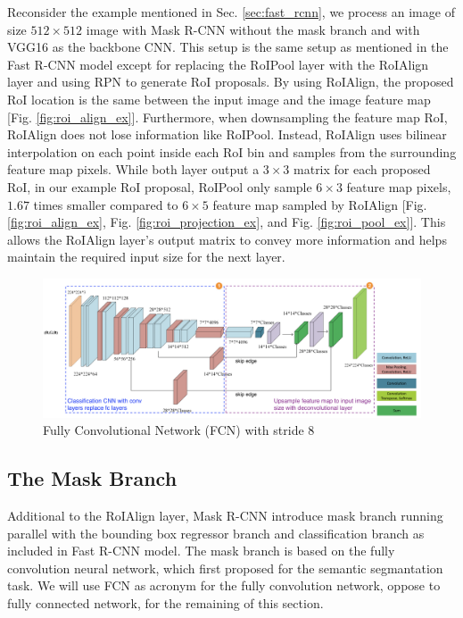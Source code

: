 Reconsider the example mentioned in Sec. \ref{sec:fast_rcnn}, we process an image of size $512 \times 512$ image with Mask R-CNN without the mask branch and with VGG16 as the backbone CNN. This setup is the same setup as mentioned in the Fast R-CNN model except for replacing the RoIPool layer with the RoIAlign layer and using RPN to generate RoI proposals. By using RoIAlign, the proposed RoI location is the same between the input image and the image feature map [Fig. \ref{fig:roi_align_ex}]. Furthermore, when downsampling the feature map RoI, RoIAlign does not lose information like RoIPool. Instead, RoIAlign uses bilinear interpolation on each point inside each RoI bin and samples from the surrounding feature map pixels. While both layer output a $3 \times 3$ matrix for each proposed RoI, in our example RoI proposal, RoIPool only sample $6 \times 3$ feature map pixels, $1.67$ times smaller compared to $6 \times 5$ feature map sampled by RoIAlign [Fig. \ref{fig:roi_align_ex}, Fig. \ref{fig:roi_projection_ex}, and Fig. \ref{fig:roi_pool_ex}]. This allows the RoIAlign layer's output matrix to convey more information and helps maintain the required input size for the next layer.

\begin{figure}[!ht]
    \centering
    \includegraphics[width=5in]{figures/fcn_archite.png}
    \caption{Fully Convolutional Network (FCN) with stride 8 \cite{fcn_archite_2018}} 
    \label{fig:fcn_archite}
\end{figure}

\subsection{The Mask Branch}

Additional to the RoIAlign layer, Mask R-CNN introduce mask branch running parallel with the bounding box regressor branch and classification branch as included in Fast R-CNN model. The mask branch is based on the fully convolution neural network, which first proposed for the semantic segmantation task. We will use FCN as acronym for the fully convolution network, oppose to fully connected network, for the remaining of this section. 

